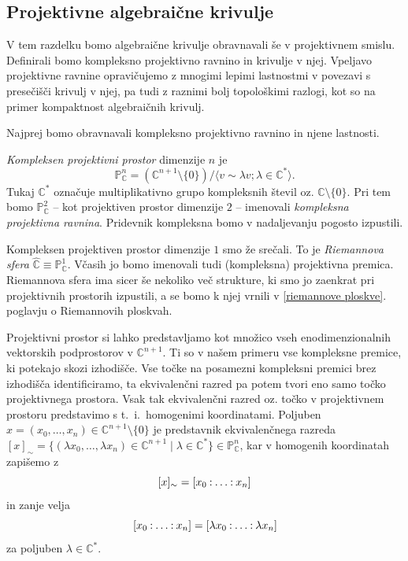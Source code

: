 \documentclass[mat1]{fmfdelo}
\numberwithin{equation}{section}
\newcommand{\C}{\mathbb C}
\newcommand{\PP}{\mathbb P}
\newcommand{\CM}{\mathbb C ^*}
\newcommand{\PC}{\mathbb{P}^2_\C}
\newcommand{\pcoor}[1]{%
\begingroup\lccode`~=`: \lowercase{\endgroup
\edef~}{\mathbin{\mathchar\the\mathcode`:}\nobreak}%
\left[%
\begingroup
\mathcode`:=\string"8000
#1%
\endgroup
\right]%
}
\newcommand{\ti}{t.~i.\ }
\theoremstyle{definition}
\begin{document}
 

\subsection{Projektivne algebraične krivulje}

V tem razdelku bomo algebraične krivulje obravnavali še v projektivnem smislu. Definirali bomo kompleksno projektivno ravnino in krivulje v njej. Vpeljavo projektivne ravnine opravičujemo z mnogimi lepimi lastnostmi v povezavi s presečišči krivulj v njej, pa tudi z raznimi bolj topološkimi razlogi, kot so na primer kompaktnost algebraičnih krivulj.

Najprej bomo obravnavali kompleksno projektivno ravnino in njene lastnosti. 
\begin{definicija}
    \emph{Kompleksen projektivni prostor} dimenzije $n$ je 
    \[
        \mathbb{P}^n_\C = (\C^{n+1} \setminus \{0 \}) / \langle v \sim \lambda v; \lambda \in \CM \rangle.
    \]
    Tukaj $\CM$ označuje multiplikativno grupo kompleksnih števil oz. $\C \setminus \{0 \}$. 
    Pri tem bomo $\PC$ -- kot projektiven prostor dimenzije $2$ -- imenovali \emph{kompleksna projektivna ravnina}. Pridevnik kompleksna bomo v nadaljevanju pogosto izpustili.
\end{definicija}

\begin{primer*}
    Kompleksen projektiven prostor dimenzije $1$ smo že srečali. To je \emph{Riemannova sfera} $\widehat{\C} \equiv \mathbb{P}^1_\C$. Včasih jo bomo imenovali tudi (kompleksna) projektivna premica. Riemannova sfera ima sicer še nekoliko več strukture, ki smo jo zaenkrat pri projektivnih prostorih izpustili, a se bomo k njej vrnili v \ref{riemannove ploskve}. poglavju o Riemannovih ploskvah.
\end{primer*}

Projektivni prostor si lahko predstavljamo kot množico vseh enodimenzionalnih vektorskih podprostorov v $\C^{n+1}$. Ti so v našem primeru vse kompleksne premice, ki potekajo skozi izhodišče. Vse točke na posamezni kompleksni premici brez izhodišča identificiramo, ta ekvivalenčni razred pa potem tvori eno samo točko projektivnega prostora. Vsak tak ekvivalenčni razred oz. točko v projektivnem prostoru predstavimo s \ti homogenimi koordinatami. Poljuben $x = (x_0, \dots, x_n) \in \C^{n+1}\setminus \{0\}$ je predstavnik ekvivalenčnega razreda $[x]_\sim = \{(\lambda x_0, \dots, \lambda x_n) \in \C^{n+1} \mid \lambda \in \CM\} \in \PP^n_\C$, kar v homogenih koordinatah zapišemo z
    \[
        [x]_\sim = \pcoor{x_0 : \ldots : x_n}
    \]
in zanje velja
    \[
        \pcoor{x_0: \ldots: x_n} = \pcoor{\lambda x_0: \ldots: \lambda x_n}
    \]
za poljuben $\lambda \in \CM$.
\end{document}
